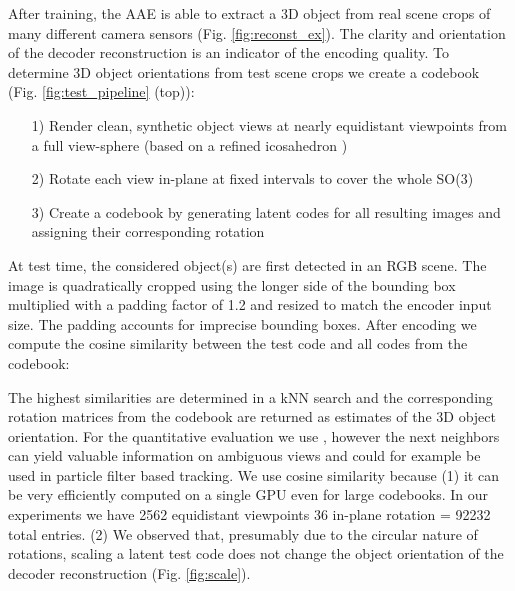 After training, the \gls{AAE} is able to extract a 3D object from real scene crops of many different camera sensors (Fig. \ref{fig:reconst_ex}). The clarity and orientation of the decoder reconstruction is an indicator of the encoding quality. To determine 3D object orientations from test scene crops we create a codebook (Fig. \ref{fig:test_pipeline} (top)):
\begin{itemize}
	\item[1)]  Render clean, synthetic object views at nearly equidistant viewpoints from a full view-sphere (based on a refined icosahedron \citep{hinterstoisser2008simultaneous})
	\item[2)] Rotate each view in-plane at fixed intervals to cover the whole SO(3)
	\item[3)] Create a codebook by generating latent codes  for all resulting images and assigning their corresponding rotation 
\end{itemize}

At test time, the considered object(s) are first detected in an RGB scene. The image is quadratically cropped using the longer side of the bounding box multiplied with a padding factor of 1.2 and resized to match the encoder input size. The padding accounts for imprecise bounding boxes. After encoding we compute the cosine similarity between the test code  and all codes  from the codebook:

The highest similarities are determined in a \gls{kNN} search and the corresponding rotation matrices  from the codebook are returned as estimates of the 3D object orientation. For the quantitative evaluation we use , however the next neighbors can yield valuable information on ambiguous views and could for example be used in particle filter based tracking. We use cosine similarity because (1) it can be very efficiently computed on a single GPU even for large codebooks. In our experiments we have 2562 equidistant viewpoints  36 in-plane rotation = 92232 total entries. (2) We observed that, presumably due to the circular nature of rotations, scaling a latent test code does not change the object orientation of the decoder reconstruction (Fig. \ref{fig:scale}).

